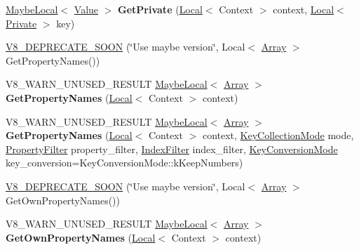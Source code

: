 \begin{DoxyCompactItemize}
\mbox{\hyperlink{classv8_1_1MaybeLocal}{Maybe\+Local}}$<$ \mbox{\hyperlink{classv8_1_1Value}{Value}} $>$ {\bfseries Get\+Private} (\mbox{\hyperlink{classv8_1_1Local}{Local}}$<$ Context $>$ context, \mbox{\hyperlink{classv8_1_1Local}{Local}}$<$ \mbox{\hyperlink{classv8_1_1Private}{Private}} $>$ key)
\item 
\mbox{\hyperlink{classv8_1_1Object_a3f735ad2eab826ddc5eba467ce624acb}{V8\+\_\+\+D\+E\+P\+R\+E\+C\+A\+T\+E\+\_\+\+S\+O\+ON}} (\char`\"{}Use maybe version\char`\"{}, Local$<$ \mbox{\hyperlink{classv8_1_1Array}{Array}} $>$ Get\+Property\+Names())
\item 
\mbox{\label{classv8_1_1Object_a771be1943535959085da5c384f8e6405}} 
V8\+\_\+\+W\+A\+R\+N\+\_\+\+U\+N\+U\+S\+E\+D\+\_\+\+R\+E\+S\+U\+LT \mbox{\hyperlink{classv8_1_1MaybeLocal}{Maybe\+Local}}$<$ \mbox{\hyperlink{classv8_1_1Array}{Array}} $>$ {\bfseries Get\+Property\+Names} (\mbox{\hyperlink{classv8_1_1Local}{Local}}$<$ Context $>$ context)
\item 
\mbox{\label{classv8_1_1Object_af892909e40c273af09893e693f4a0137}} 
V8\+\_\+\+W\+A\+R\+N\+\_\+\+U\+N\+U\+S\+E\+D\+\_\+\+R\+E\+S\+U\+LT \mbox{\hyperlink{classv8_1_1MaybeLocal}{Maybe\+Local}}$<$ \mbox{\hyperlink{classv8_1_1Array}{Array}} $>$ {\bfseries Get\+Property\+Names} (\mbox{\hyperlink{classv8_1_1Local}{Local}}$<$ Context $>$ context, \mbox{\hyperlink{namespacev8_a0cee20f5c7f0d59d0835af8e537388dc}{Key\+Collection\+Mode}} mode, \mbox{\hyperlink{namespacev8_afbf02b6b1152a3e25d7bde90798209ac}{Property\+Filter}} property\+\_\+filter, \mbox{\hyperlink{namespacev8_a46fd71fef702b35b34ed7495e7a63323}{Index\+Filter}} index\+\_\+filter, \mbox{\hyperlink{namespacev8_aa65aeff871614520d8033dead4b34e38}{Key\+Conversion\+Mode}} key\+\_\+conversion=Key\+Conversion\+Mode\+::k\+Keep\+Numbers)
\item 
\mbox{\hyperlink{classv8_1_1Object_aa72e9d0d22d1d4a4c4b63827a5469d40}{V8\+\_\+\+D\+E\+P\+R\+E\+C\+A\+T\+E\+\_\+\+S\+O\+ON}} (\char`\"{}Use maybe version\char`\"{}, Local$<$ \mbox{\hyperlink{classv8_1_1Array}{Array}} $>$ Get\+Own\+Property\+Names())
\item 
\mbox{\label{classv8_1_1Object_ab4f1fc692a02c11d749a7d5120e67026}} 
V8\+\_\+\+W\+A\+R\+N\+\_\+\+U\+N\+U\+S\+E\+D\+\_\+\+R\+E\+S\+U\+LT \mbox{\hyperlink{classv8_1_1MaybeLocal}{Maybe\+Local}}$<$ \mbox{\hyperlink{classv8_1_1Array}{Array}} $>$ {\bfseries Get\+Own\+Property\+Names} (\mbox{\hyperlink{classv8_1_1Local}{Local}}$<$ Context $>$ context)

\end{DoxyCompactItemize}
